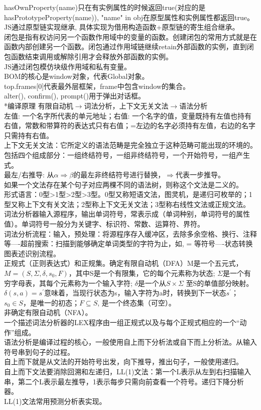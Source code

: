 \documentclass[UTF8]{ctexart}
\makeatletter
\renewcommand{\section}{\@startsection{section}{1}{0mm}
  {-\baselineskip}{0.5\baselineskip}{\bf\leftline}}
\makeatother
\begin{document}
hasOwnProperty(name)只在有实例属性的时候返回true(对应的是hasPrototypeProperty(name)), "name" in obj在原型属性和实例属性都返回true。\\
JS通过原型链实现继承, 具体实现为借用构造函数+原型链的寄生组合继承。\\
闭包是指有权访问另一个函数作用域中的变量的函数。创建闭包的常用方式就是在函数内部创建另一个函数。闭包通过作用域链继续retain外部函数的实例，直到闭包函数结束调用或解除引用才会释放外部函数的实例。\\
JS通过闭包模仿块级作用域和私有变量。\\
BOM的核心是window对象，代表Global对象。\\
top.frames[0]代表最外层框架，frame中包含window的集合。\\
alter(), confirm(), prompt()用于弹出对话框。\\
\section*{编译原理}
\noindent 有限自动机$\rightarrow$词法分析，上下文无关文法$\rightarrow$语法分析\\
左值: 一个名字所代表的单元地址；右值: 一个名字的值，变量既持有左值也持有右值，常数和带算符的表达式只有右值；=左边的名字必须持有左值，右边的名字只需持有右值。\\
上下文无关文法：它所定义的语法范畴是完全独立于这种范畴可能出现的环境的。包括四个组成部分：一组终结符号，一组非终结符号，一个开始符号，一组产生式。\\
最左/右推导: 从$\alpha\Rightarrow\beta$的最左非终结符号进行替换，$\Rightarrow$代表一步推导。\\
如果一个文法存在某个句子对应两棵不同的语法树，则称这个文法是二义的。\\
形式语言：0型>1型>2型>3型。0型又称短语文法，图灵机，是递归可枚举的；1型又称上下文有关文法；2型称上下文无关文法；3型称右线性文法或正规文法。\\
词法分析器输入源程序，输出单词符号，常表示成（单词种别，单词符号的属性值）。单词符号一般分为关键字、标识符、常数、运算符、界符。\\
词法分析流程：输入，预处理：将源程序存入缓冲区，去除多余空格、换行、注释等----超前搜索：扫描到能够确定单词类型的字符为止，如, = 等符号----状态转换图表述识别流程。\\
正规式（正则表达式）和正规集。确定有限自动机（DFA）M是一个五元式，$M=(S,\Sigma,\delta,s_0,F)$，其中S是一个有限集，它的每个元素称为状态; $\Sigma$是一个有穷字母表，其每个元素称为一个输入字符; $\delta$是一个从$S\times \Sigma$ 至S的单值部分映射。$\delta(s,a)=s^{'}$意味着，当现行状态为s，输入字符为a时，转换到下一状态$s^{'}$；$s_0\in S$，是唯一的初态；$F\subseteq S$, 是一个终态集（可空）。\\
非确定有限自动机（NFA）。\\
一个描述词法分析器的LEX程序由一组正规式以及与每个正规式相应的一个“动作”组成。\\
语法分析是编译过程的核心，一般使用自上而下分析法或自下而上分析法。从输入符号串到句子的过程。\\
自上而下就是从文法的开始符号出发，向下推导，推出句子，一般使用递归。\\
自上而下文法要消除回溯和左递归，LL(1)文法：第一个L表示从左到右扫描输入串，第二个L表示最左推导，1表示每步只需向前查看一个符号。递归下降分析器。\\
LL(1)文法常用预测分析表实现。
\end{document}
